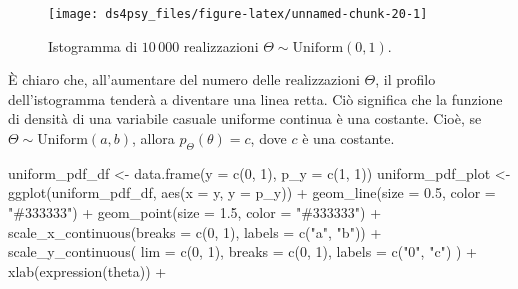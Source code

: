 \documentclass[
  11pt,
]{krantz}
\makeatletter
\newenvironment{Shaded}{\begin{snugshade}}{\end{snugshade}}
\newcommand{\AttributeTok}[1]{\textcolor[rgb]{0.61,0.61,0.61}{#1}}
\newcommand{\DecValTok}[1]{\textcolor[rgb]{0.06,0.06,0.06}{#1}}
\newcommand{\FloatTok}[1]{\textcolor[rgb]{0.06,0.06,0.06}{#1}}
\newcommand{\FunctionTok}[1]{\textcolor[rgb]{0,0,0}{#1}}
\newcommand{\NormalTok}[1]{#1}
\newcommand{\OtherTok}[1]{\textcolor[rgb]{0.37,0.37,0.37}{#1}}
\newcommand{\SpecialCharTok}[1]{\textcolor[rgb]{0,0,0}{#1}}
\newcommand{\StringTok}[1]{\textcolor[rgb]{0.5,0.5,0.5}{#1}}
\newenvironment{kframe}{%
\medskip{}
\setlength{\fboxsep}{.8em}
 \def\at@end@of@kframe{}%
 \ifinner\ifhmode%
  \def\at@end@of@kframe{\end{minipage}}%
  \begin{minipage}{\columnwidth}%
 \fi\fi%
 \def\FrameCommand##1{\hskip\@totalleftmargin \hskip-\fboxsep
 \colorbox{shadecolor}{##1}\hskip-\fboxsep
     \hskip-\linewidth \hskip-\@totalleftmargin \hskip\columnwidth}%
 \MakeFramed {\advance\hsize-\width
   \@totalleftmargin\z@ \linewidth\hsize
   \@setminipage}}%
 {\par\unskip\endMakeFramed%
 \at@end@of@kframe}
\renewenvironment{Shaded}{\begin{kframe}}{\end{kframe}}
\theoremstyle{definition}
\theoremstyle{definition}
\theoremstyle{definition}
\theoremstyle{definition}
\theoremstyle{remark}
\makeatother
\begin{document}
\begin{figure}[h]

{\centering \texttt{[image: ds4psy\_files/figure-latex/unnamed-chunk-20-1]} 

}

\caption{Istogramma di $10\,000$ realizzazioni $\Theta \sim \mbox{Uniform}(0, 1)$. }\label{fig:unnamed-chunk-20}
\end{figure}

È chiaro che, all'aumentare del numero delle realizzazioni \(\Theta\), il profilo dell'istogramma tenderà a diventare una linea retta. Ciò significa che la funzione di densità di una variabile casuale uniforme continua è una costante. Cioè, se \(\Theta \sim \mbox{Uniform} (a, b)\), allora \(p_{\Theta}(\theta) = c\), dove \(c\) è una costante.

\begin{Shaded}
\begin{Highlighting}[]
\NormalTok{uniform\_pdf\_df }\OtherTok{\textless{}{-}} \FunctionTok{data.frame}\NormalTok{(}\AttributeTok{y =} \FunctionTok{c}\NormalTok{(}\DecValTok{0}\NormalTok{, }\DecValTok{1}\NormalTok{), }\AttributeTok{p\_y =} \FunctionTok{c}\NormalTok{(}\DecValTok{1}\NormalTok{, }\DecValTok{1}\NormalTok{))}
\NormalTok{uniform\_pdf\_plot }\OtherTok{\textless{}{-}}
  \FunctionTok{ggplot}\NormalTok{(uniform\_pdf\_df, }\FunctionTok{aes}\NormalTok{(}\AttributeTok{x =}\NormalTok{ y, }\AttributeTok{y =}\NormalTok{ p\_y)) }\SpecialCharTok{+}
  \FunctionTok{geom\_line}\NormalTok{(}\AttributeTok{size =} \FloatTok{0.5}\NormalTok{, }\AttributeTok{color =} \StringTok{"\#333333"}\NormalTok{) }\SpecialCharTok{+}
  \FunctionTok{geom\_point}\NormalTok{(}\AttributeTok{size =} \FloatTok{1.5}\NormalTok{, }\AttributeTok{color =} \StringTok{"\#333333"}\NormalTok{) }\SpecialCharTok{+}
  \FunctionTok{scale\_x\_continuous}\NormalTok{(}\AttributeTok{breaks =} \FunctionTok{c}\NormalTok{(}\DecValTok{0}\NormalTok{, }\DecValTok{1}\NormalTok{), }\AttributeTok{labels =} \FunctionTok{c}\NormalTok{(}\StringTok{"a"}\NormalTok{, }\StringTok{"b"}\NormalTok{)) }\SpecialCharTok{+}
  \FunctionTok{scale\_y\_continuous}\NormalTok{(}
    \AttributeTok{lim =} \FunctionTok{c}\NormalTok{(}\DecValTok{0}\NormalTok{, }\DecValTok{1}\NormalTok{), }\AttributeTok{breaks =} \FunctionTok{c}\NormalTok{(}\DecValTok{0}\NormalTok{, }\DecValTok{1}\NormalTok{),}
    \AttributeTok{labels =} \FunctionTok{c}\NormalTok{(}\StringTok{"0"}\NormalTok{, }\StringTok{"c"}\NormalTok{)}
\NormalTok{  ) }\SpecialCharTok{+}
  \FunctionTok{xlab}\NormalTok{(}\FunctionTok{expression}\NormalTok{(theta)) }\SpecialCharTok{+}

\end{Highlighting}
\end{Shaded}
\end{document}
